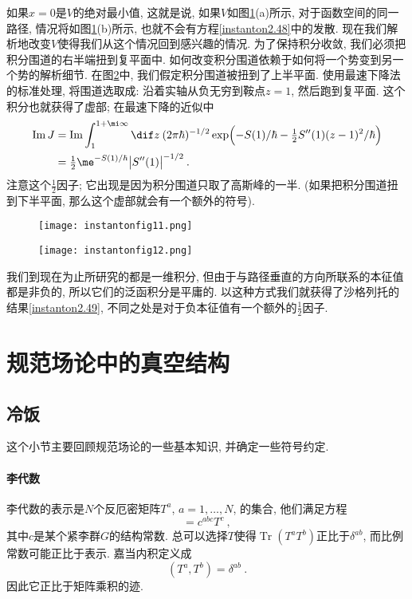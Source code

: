 如果$x=0$是$V$的绝对最小值, 这就是说, 如果$V$如图\ref{instantonfig11}(a)所示, 对于函数空间的同一路径, 情况将如图\ref{instantonfig11}(b)所示, 也就不会有方程\eqref{instanton2.48}中的发散. 现在我们解析地改变$V$使得我们从这个情况回到感兴趣的情况. 为了保持积分收敛, 我们必须把积分围道的右半端扭到复平面中. 如何改变积分围道依赖于如何将一个势变到另一个势的解析细节. 在图\ref{instantonfig12}中, 我们假定积分围道被扭到了上半平面. 使用最速下降法的标准处理, 将围道选取成: 沿着实轴从负无穷到鞍点$z=1$, 然后跑到复平面. 这个积分也就获得了虚部; 在最速下降的近似中
\begin{align}
    \operatorname{Im} J &= \operatorname{Im} \int_{1}^{1+\mi\infty} \dif z\: (2\pi\hbar)^{-1/2} \exp\Bigl(-S(1)/\hbar- \tfrac{1}{2}S''(1)(z-1)^{2}/\hbar\Bigr) \nonumber \\
    &=\tfrac{1}{2}\me^{-S(1)/\hbar} \bigl\lvert S''(1)\bigr\rvert^{-1/2} \:. \label{instanton2.52}
\end{align}
注意这个$\tfrac{1}{2}$因子; 它出现是因为积分围道只取了高斯峰的一半. (如果把积分围道扭到下半平面, 那么这个虚部就会有一个额外的符号).

\begin{figure}[h]
    \centering
    \texttt{[image: instantonfig11.png]}
    \caption{ \label{instantonfig11}}
  \end{figure}

  \begin{figure}[h]
    \centering
    \texttt{[image: instantonfig12.png]}
    \caption{ \label{instantonfig12}}
  \end{figure}

我们到现在为止所研究的都是一维积分, 但由于与路径垂直的方向所联系的本征值都是非负的, 所以它们的泛函积分是平庸的. 以这种方式我们就获得了沙格列托的结果\eqref{instanton2.49}, 不同之处是对于负本征值有一个额外的$\tfrac{1}{2}$因子.


\section{规范场论中的真空结构}

\subsection{冷饭} \label{instanton:sec3.1}

这个小节主要回顾规范场论的一些基本知识, 并确定一些符号约定.

\paragraph*{李代数} 李代数的表示是$N$个反厄密矩阵$T^{a}$, $a=1,\ldots,N$, 的集合, 他们满足方程
\begin{equation}
    [T^{a},T^{b}]= c^{abc} T^{c} \:, \label{instanton3.1}
\end{equation}
其中$c$是某个紧李群$G$的结构常数. 总可以选择$T$使得$\operatorname{Tr}(T^{a}T^{b})$正比于$\delta^{ab}$, 而比例常数可能正比于表示. 嘉当内积定义成
\begin{equation}
    (T^{a},T^{b}) = \delta^{ab} \:. \label{instanton3.2}
\end{equation}
因此它正比于矩阵乘积的迹.

